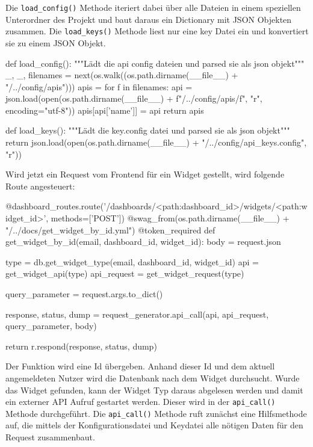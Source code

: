 Die \texttt{load\_{}config()} Methode iteriert dabei über alle Dateien in einem speziellen Unterordner des Projekt und baut daraus ein Dictionary mit JSON Objekten zusammen. 
Die \texttt{load\_{}keys()} Methode liest nur eine key Datei ein und konvertiert sie zu einem JSON Objekt.

\begin{python}
def load_config():
    """Lädt die api config dateien und parsed sie als json objekt"""
    _, _, filenames = next(os.walk((os.path.dirname(__file__) + "/../config/apis")))
    apis = {}
    for f in filenames:
        api = json.load(open(os.path.dirname(__file__) + f"/../config/apis/{f}", "r", encoding="utf-8"))
        apis[api['name']] = api
    return apis


def load_keys():
    """Lädt die key.config datei und parsed sie als json objekt"""
    return json.load(open(os.path.dirname(__file__) + "/../config/api_keys.config", "r"))
\end{python}

Wird jetzt ein Request vom Frontend für ein Widget gestellt, wird folgende Route angesteuert:

\begin{python}
@dashboard_routes.route('/dashboards/<path:dashboard_id>/widgets/<path:widget_id>', methods=['POST'])
@swag_from(os.path.dirname(__file__) + "/../docs/get_widget_by_id.yml")
@token_required
def get_widget_by_id(email, dashboard_id, widget_id):
    body = request.json

    type = db.get_widget_type(email, dashboard_id, widget_id)
    api = get_widget_api(type)
    api_request = get_widget_request(type)

    query_parameter = request.args.to_dict()

    response, status, dump = request_generator.api_call(api, api_request, query_parameter, body)

    return r.respond(response, status, dump)
\end{python}

Der Funktion wird eine Id übergeben. Anhand dieser Id und dem aktuell angemeldeten Nutzer wird die Datenbank nach dem Widget durchsucht. Wurde das Widget gefunden, kann der Widget Typ daraus abgelesen werden und damit ein externer API Aufruf gestartet werden. Dieser wird in der \texttt{api\_{}call()} Methode durchgeführt. Die \texttt{api\_{}call()} Methode ruft zunächst eine Hilfsmethode auf, die mittels der Konfigurationsdatei und Keydatei alle nötigen Daten für den Request zusammenbaut. 

